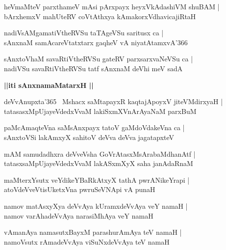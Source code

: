 \documentclass[twoside,12pt,openright]{book}
\newcounter{shloka}[chapter]
\def\uvaca#1{\centerline{{\large\textbf{#1}}}}
\begin{document}
\begin{shloka}%
heVmaMteV parxthameV mAsi pArxpayx heyxVkAdashiVM shuBAM |\\
bArxhemxV mahUteRV coVtAthxya kAmakorxVdhavicajiRtaH 
\end{shloka}

\begin{shloka}%
nadiVsAMgamatiVtheRVSu taTAgeVSu saritusx ca |\\
sAnxnaM samAcareVtatxtarx gaqheV vA niyatAtamxvA\char'366
\end{shloka}

\begin{shloka}%
sAnxtoVhaM savaRtiVtheRVSu gateRV parxsarxvaNeVSu ca |\\
nadiVSu savaRtiVtheRVSu tatf sAnxnaM deVhi meV sadA 
\end{shloka}

\uvaca{||iti sAnxnamaMatarxH ||}

\begin{shloka}%
deVvAnupxta\char'365 ~Mshacx saMtapayxR kaqtajApoyxV jiteVMdirxyaH |\\
tatasasxMpUjayeVdedxVvaM lakiSxmXVnArAyaNaM parxBuM 
\end{shloka}

\begin{shloka}%
paMcAmaqteVna saMsAnxpayx tatoV gaMdoVdakeVna ca |\\
sAnxtoVSi lakAmxyX sahitoV deVva deVva jagatapxteV
\end{shloka}

\begin{shloka}%
mAM samudadhxra deVveVsha GoVrAtasxMsArabaMdhanAtf |\\
tatasxsaMpUjayeVdedxVvaM lakASxmXyX saha janAdaRnaM
\end{shloka}

\begin{shloka}%
maMterxYsutx veYdikeYBaRkAtxyX tathA pwrANikeYrapi |\\
atoVdeVveVtisUketxVna pwruSeVNApi vA punaH 
\end{shloka}

\begin{shloka}%
namov matAsxyXya deVvAya kUramxdeVvAya veY namaH |\\
namov varAhadeVvAya narasiMhAya veY namaH 
\end{shloka}

\begin{shloka}%
vAmanAya namasutxBayxM parashurAmAya teV namaH |\\
namoVsutx rAmadeVvAya viSuNxdeVvAya teV namaH 
\end{shloka}
\end{document}
